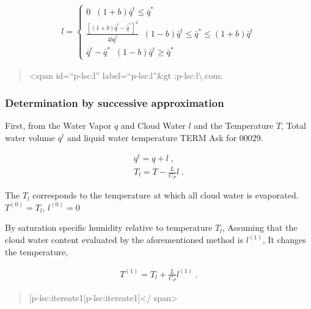 \begin{eqnarray}
  l = \left\{
           \begin{array}{ll} \displaystyle
             0 \; \;  (1+b)\bar{q}^t \leq \bar{q}^* \\
            \displaystyle
             \frac{\left[(1+b)\bar{q}^t - \bar{q}^*\right]^2}
                  {4b\bar{q}^t}
               \; \;  (1-b)\bar{q}^t \leq \bar{q}^* \leq (1+b)\bar{q}^t  \\
            \displaystyle
             \bar{q}^t - \bar{q}^*
                \; \;  (1-b)\bar{q}^t \geq \bar{q}^*
           \end{array}
        \right.
\end{eqnarray}

\begin{quote}
\textless span id=``p-lsc:l'' label=``p-lsc:l''\&gt
;p-lsc:l\textbackslash.com;
\end{quote}

\hypertarget{determination-by-successive-approximation}{%
\subsubsection{Determination by successive
approximation}\label{determination-by-successive-approximation}}

First, from the Water Vapor \(q\) and Cloud Water \(l\) and the
Temperature \(T\), Total water volume \(q^t\) and liquid water
temperature TERM Ask for 00029.

\begin{eqnarray}
  q^t   =  q + l \; , \\
  T_l   =  T - \frac{L}{C_P} l \; .
\end{eqnarray}

The \(T_l\) corresponds to the temperature at which all cloud water is
evaporated. \(T^{(0)} = T_l\), \(l^{(0)} = 0\)

By saturation specific humidity relative to temperature \(T_l\),
Assuming that the cloud water content evaluated by the aforementioned
method is \(l^{(1)}\), It changes the temperature,

\begin{eqnarray}
  T^{(1)} = T_l +  \frac{L}{C_P} l^{(1)} \; .
\end{eqnarray}

\begin{quote}
{[}p-lsc:itereate1{[}p-lsc:itereate1{]}\textless/ span\textgreater{}
\end{quote}

